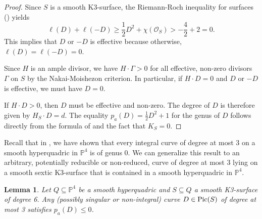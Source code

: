\documentclass[english,11pt,reqno]{amsart}
\newcommand{\sub}{\subseteq}
\newcommand{\Pfour}{\mathbb{P}^4}
\newcommand{\Pic}{\textup{Pic}}
\newtheorem{lem}[thm]{Lemma}
\begin{document}
%
%
\begin{proof}
Since $S$ is a smooth K3-surface, the Riemann-Roch inequality for surfaces () yields
$$\ell(D)+\ell(-D) \geq \frac{1}{2}D^2 + \chi(\mathcal{O}_S) > -\frac{4}{2} + 2=0.$$ 
This implies that $D$ or $-D$ is effective because otherwise, $\ell(D)=\ell(-D)=0$. \par
Since $H$ is an ample divisor, we have $H\cdot\Gamma >0$ for all effective, non-zero divisors $\Gamma$ on $S$ by the Nakai-Moishezon criterion. In particular, if $H\cdot D=0$ and $D$ or $-D$ is effective, we must have $D=0$. \par 
If $H\cdot D >0$, then $D$ must be effective and non-zero. The degree of $D$ is therefore given by $H_S\cdot D=d$. The equality $p_a(D)=\frac{1}{2} D^2 +1$ for the genus of $D$ follows directly from the formula of  and the fact that $K_S=0$.
\end{proof}
%
Recall that in , we have shown that every integral curve of degree at most 3 on a smooth hyperquadric in $\Pfour$ is of genus 0. We can generalize this result to an arbitrary, potentially reducible or non-reduced, curve of degree at most 3 lying on a smooth sextic K3-surface that is contained in a smooth hyperquadric in $\Pfour$.
%
\begin{lem} \label{lem:divisor_degree_3_genus_1}
Let $Q\sub \Pfour$ be a smooth hyperquadric and $S\sub Q$ a smooth K3-surface of degree 6. Any (possibly singular or non-integral) curve $D\in\Pic(S)$ of degree at most 3 satisfies $p_a(D)\leq 0$.
\end{lem}
% 
\end{document}
